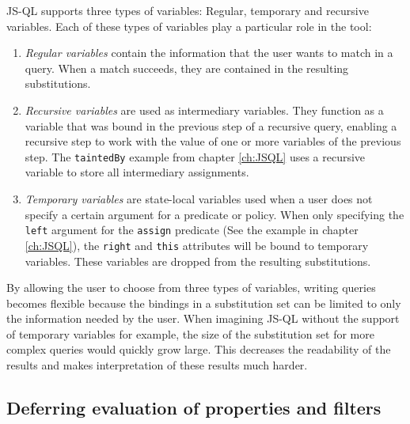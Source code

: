 JS-QL supports three types of variables: Regular, temporary and recursive variables. Each of these types of variables play a particular role in the tool:
\begin{enumerate}
\item \textit{Regular variables} contain the information that the user wants to match in a query. When a match succeeds, they are contained in the resulting substitutions.
\item \textit{Recursive variables} are used as intermediary variables. They function as a variable that was bound in the previous step of a recursive query, enabling a recursive step to work with the value of one or more variables of the previous step. The \texttt{taintedBy} example from chapter \ref{ch:JSQL} uses a recursive variable to store all intermediary assignments.
\item \textit{Temporary variables} are state-local variables used when a user does not specify a certain argument for a predicate or policy. When only specifying the \texttt{left} argument for the \texttt{assign} predicate (See the example in chapter \ref{ch:JSQL}), the \texttt{right} and \texttt{this} attributes will be bound to temporary variables. These variables are dropped from the resulting substitutions.
\end{enumerate}

\noindent By allowing the user to choose from three types of variables, writing queries becomes flexible because the bindings in a substitution set can be limited to only the information needed by the user. When imagining JS-QL without the support of temporary variables for example, the size of the substitution set for more complex queries would quickly grow large. This decreases the readability of the results and makes interpretation of these results much harder.

\subsection*{Deferring evaluation of properties and filters}

